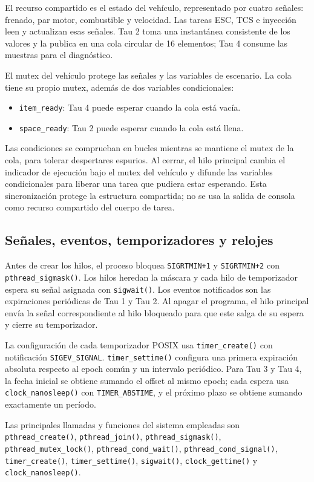\documentclass[12pt,a4paper]{article}
\begin{document}
El recurso compartido es el estado del vehículo, representado por cuatro señales: frenado, par motor, combustible y velocidad. Las tareas ESC, TCS e inyección leen y actualizan esas señales. Tau 2 toma una instantánea consistente de los valores y la publica en una cola circular de 16 elementos; Tau 4 consume las muestras para el diagnóstico.

El mutex del vehículo protege las señales y las variables de escenario. La cola tiene su propio mutex, además de dos variables condicionales:
\begin{itemize}
  \item \texttt{item\_ready}: Tau 4 puede esperar cuando la cola está vacía.
  \item \texttt{space\_ready}: Tau 2 puede esperar cuando la cola está llena.
\end{itemize}
Las condiciones se comprueban en bucles mientras se mantiene el mutex de la cola, para tolerar despertares espurios. Al cerrar, el hilo principal cambia el indicador de ejecución bajo el mutex del vehículo y difunde las variables condicionales para liberar una tarea que pudiera estar esperando. Esta sincronización protege la estructura compartida; no se usa la salida de consola como recurso compartido del cuerpo de tarea.

\subsection{Señales, eventos, temporizadores y relojes}

Antes de crear los hilos, el proceso bloquea \texttt{SIGRTMIN+1} y \texttt{SIGRTMIN+2} con \texttt{pthread\_sigmask()}. Los hilos heredan la máscara y cada hilo de temporizador espera su señal asignada con \texttt{sigwait()}. Los eventos notificados son las expiraciones periódicas de Tau 1 y Tau 2. Al apagar el programa, el hilo principal envía la señal correspondiente al hilo bloqueado para que este salga de su espera y cierre su temporizador.

La configuración de cada temporizador POSIX usa \texttt{timer\_create()} con notificación \texttt{SIGEV\_SIGNAL}. \texttt{timer\_settime()} configura una primera expiración absoluta respecto al epoch común y un intervalo periódico. Para Tau 3 y Tau 4, la fecha inicial se obtiene sumando el offset al mismo epoch; cada espera usa \texttt{clock\_nanosleep()} con \texttt{TIMER\_ABSTIME}, y el próximo plazo se obtiene sumando exactamente un período.

Las principales llamadas y funciones del sistema empleadas son \texttt{pthread\_create()}, \texttt{pthread\_join()}, \texttt{pthread\_sigmask()}, \texttt{pthread\_mutex\_lock()}, \texttt{pthread\_cond\_wait()}, \texttt{pthread\_cond\_signal()}, \texttt{timer\_create()}, \texttt{timer\_settime()}, \texttt{sigwait()}, \texttt{clock\_gettime()} y \texttt{clock\_nanosleep()}.
\end{document}
